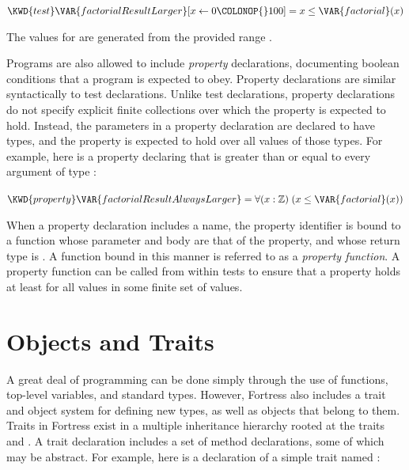 \begin{Fortress}
\(\KWD{test} \VAR{factorialResultLarger} [x \leftarrow 0\COLONOP{}100] = x \leq \VAR{factorial}(x)\)
\end{Fortress}

The values for  are generated from the provided range
.

Programs are also allowed to include \emph{property} declarations, documenting boolean conditions that a program is
expected to obey. Property declarations are similar syntactically to test declarations. Unlike test declarations,
property declarations do not specify explicit finite collections over which the property is expected to hold.
Instead, the parameters in a property declaration are declared to have types, and the property is expected to hold
over all values of those types. For example, here is a property declaring that  is greater than or equal
to every argument of type :

\begin{Fortress}
\(\KWD{property} \VAR{factorialResultAlwaysLarger} = \forall (x \mathrel{\mathtt{:}} \mathbb{Z})\; (x \leq \VAR{factorial}(x))\)
\end{Fortress}

When a property declaration includes a name, the property identifier is bound to a function whose parameter and body are that of the property,
and whose return type is .
A function bound in this manner is referred to as a \emph{property function}.
A property function can be called from within tests to ensure that a
property holds at least for all values in some finite set of values.

\section{Objects and Traits}

A great deal of programming can be done simply through the use of
functions, top-level
variables, and standard types. However, Fortress also includes a trait and object system for
defining new types, as well as objects that belong to them. Traits in Fortress exist in
a multiple inheritance hierarchy rooted at the traits  and .
A trait declaration includes a set of method declarations,
some of which may be abstract.
For example, here is a declaration of a simple trait named :

